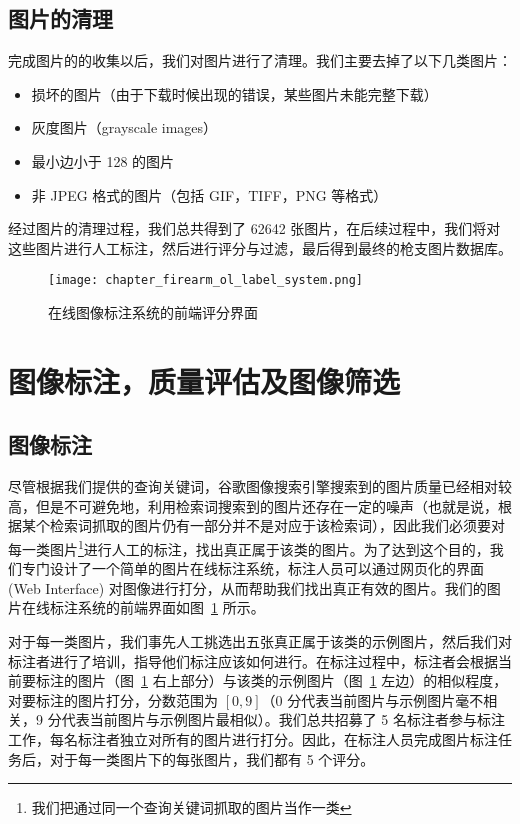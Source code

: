 \subsection{图片的清理}
完成图片的的收集以后，我们对图片进行了清理。我们主要去掉了以下几类图片：
\begin{itemize}
\item 损坏的图片（由于下载时候出现的错误，某些图片未能完整下载）
\item 灰度图片（grayscale images）
\item 最小边小于 128 的图片
\item 非 JPEG 格式的图片（包括 GIF，TIFF，PNG 等格式）
\end{itemize}

经过图片的清理过程，我们总共得到了 62642 张图片，在后续过程中，我们将对这些图片进行人工标注，然后进行评分与过滤，最后得到最终的枪支图片数据库。

\begin{figure}[!t]
	\centering
	\texttt{[image: chapter\_firearm\_ol\_label\_system.png]}
	\caption{在线图像标注系统的前端评分界面}
	\label{fig:online_label_system}
\end{figure}

\section{图像标注，质量评估及图像筛选}\label{sec:image_label_filtering}

\subsection{图像标注}
尽管根据我们提供的查询关键词，谷歌图像搜索引擎搜索到的图片质量已经相对较高，但是不可避免地，利用检索词搜索到的图片还存在一定的噪声（也就是说，根据某个检索词抓取的图片仍有一部分并不是对应于该检索词），因此我们必须要对每一类图片\footnote{我们把通过同一个查询关键词抓取的图片当作一类}进行人工的标注，找出真正属于该类的图片。为了达到这个目的，我们专门设计了一个简单的图片在线标注系统，标注人员可以通过网页化的界面 (Web Interface) 对图像进行打分，从而帮助我们找出真正有效的图片。我们的图片在线标注系统的前端界面如图~\ref{fig:online_label_system} 所示。

对于每一类图片，我们事先人工挑选出五张真正属于该类的示例图片，然后我们对标注者进行了培训，指导他们标注应该如何进行。在标注过程中，标注者会根据当前要标注的图片（图~\ref{fig:online_label_system} 右上部分）与该类的示例图片（图~\ref{fig:online_label_system} 左边）的相似程度，对要标注的图片打分，分数范围为 $[0,9]$（0 分代表当前图片与示例图片毫不相关，9 分代表当前图片与示例图片最相似）。我们总共招募了 5 名标注者参与标注工作，每名标注者独立对所有的图片进行打分。因此，在标注人员完成图片标注任务后，对于每一类图片下的每张图片，我们都有 5 个评分。

